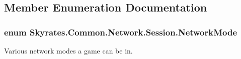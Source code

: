 \subsection{Member Enumeration Documentation}
\hypertarget{class_skyrates_1_1_common_1_1_network_1_1_session_ad2f4973bc77af540bd68a428e349fbff}{
\subsubsection[{Network\-Mode}]{\setlength{\rightskip}{0pt plus 5cm}enum {\bf Skyrates.\-Common.\-Network.\-Session.\-Network\-Mode}}}\label{class_skyrates_1_1_common_1_1_network_1_1_session_ad2f4973bc77af540bd68a428e349fbff}


Various network modes a game can be in. 


